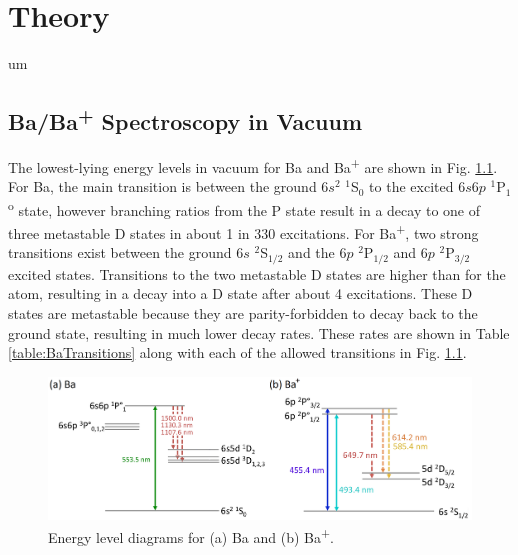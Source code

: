 \chapter{Theory}


um

\section{Ba/Ba\textsuperscript{+} Spectroscopy in Vacuum}

The lowest-lying energy levels in vacuum for Ba and Ba\textsuperscript{+} are shown in Fig. \ref{fig:elevs}.  For Ba, the main transition is between the ground $6s^{2}$ $^{1}$S$_{0}$ to the excited $6s6p$ $^{1}$P$_{1}$\textsuperscript{o} state, however branching ratios from the P state result in a decay to one of three metastable D states in about 1 in 330 excitations.  For Ba\textsuperscript{+}, two strong transitions exist between the ground $6s$ $^{2}$S$_{1/2}$ and the $6p$ $^{2}$P$_{1/2}$ and $6p$ $^{2}$P$_{3/2}$ excited states.  Transitions to the two metastable D states are higher than for the atom, resulting in a decay into a D state after about 4 excitations.  These D states are metastable because they are parity-forbidden to decay back to the ground state, resulting in much lower decay rates.  These rates are shown in Table \ref{table:BaTransitions} along with each of the allowed transitions in Fig. \ref{fig:elevs}.

\begin{figure}[H]
	\includegraphics[width=.9\textwidth]{figures/elevs.png}
	\caption{Energy level diagrams for (a) Ba and (b) Ba\textsuperscript{+}.}
    \label{fig:elevs}
\end{figure}


